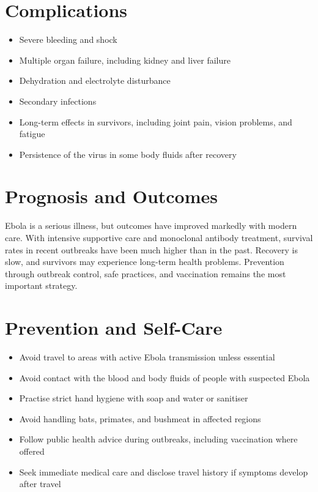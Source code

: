 \section*{Complications}
\begin{itemize}
    \item Severe bleeding and shock
    \item Multiple organ failure, including kidney and liver failure
    \item Dehydration and electrolyte disturbance
    \item Secondary infections
    \item Long-term effects in survivors, including joint pain, vision problems, and fatigue
    \item Persistence of the virus in some body fluids after recovery
\end{itemize}

\section*{Prognosis and Outcomes}
Ebola is a serious illness, but outcomes have improved markedly with modern care. With intensive supportive care and monoclonal antibody treatment, survival rates in recent outbreaks have been much higher than in the past. Recovery is slow, and survivors may experience long-term health problems. Prevention through outbreak control, safe practices, and vaccination remains the most important strategy.

\section*{Prevention and Self-Care}
\begin{itemize}
    \item Avoid travel to areas with active Ebola transmission unless essential
    \item Avoid contact with the blood and body fluids of people with suspected Ebola
    \item Practise strict hand hygiene with soap and water or sanitiser
    \item Avoid handling bats, primates, and bushmeat in affected regions
    \item Follow public health advice during outbreaks, including vaccination where offered
    \item Seek immediate medical care and disclose travel history if symptoms develop after travel
\end{itemize}

